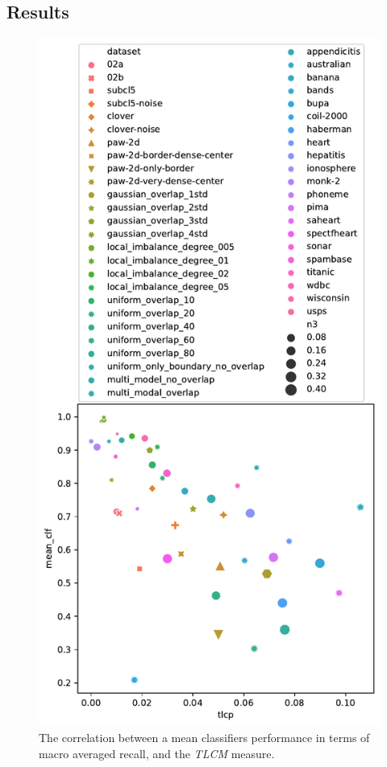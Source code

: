 \subsection{Results}
\begin{figure}[tbp]
\centering
\includegraphics[width=0.8\columnwidth]{plots/dataset_plots/siam_full_plot_tlcp.pdf}
\caption{The correlation between a mean classifiers performance in terms of macro averaged recall, and the \emph{TLCM} measure.}
\label{fig:tlcp_dataset_plot}
\end{figure}
